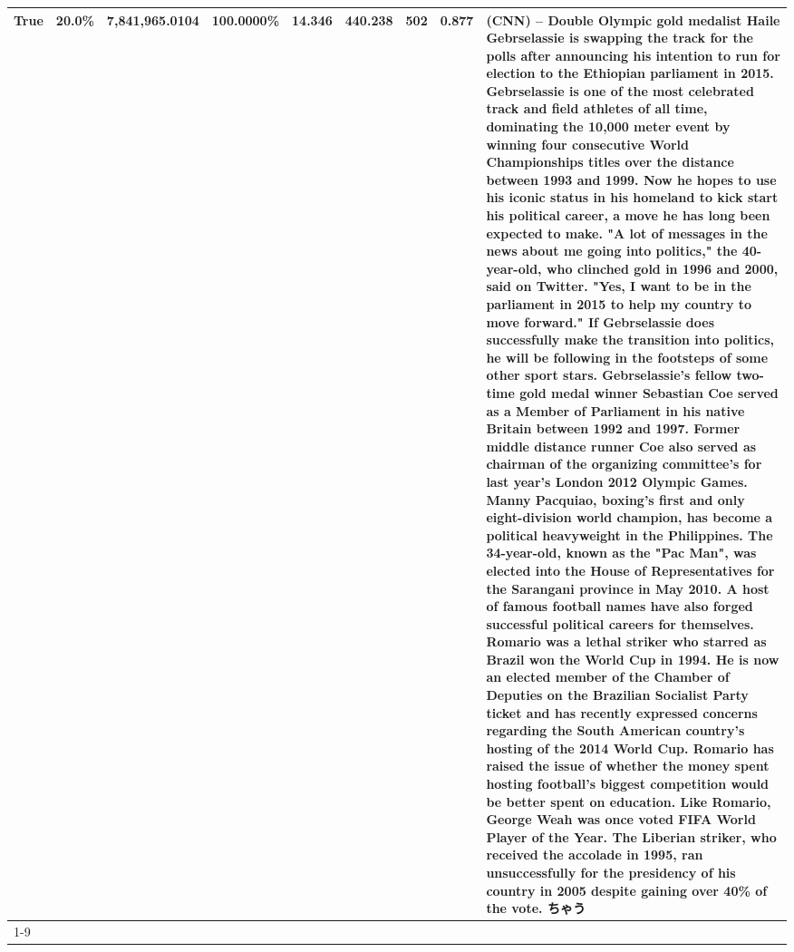 \begin{table}[H]
{\begin{tabular}{lllrlllll}
True & 20.0\% & 7,841,965.0104 & \bfseries \color{red} 100.0000\% & 14.346 & 440.238 & 502 & 0.877 & (CNN) -- Double Olympic gold medalist Haile Gebrselassie is swapping the track for the polls after announcing his intention to run for election to the Ethiopian parliament in 2015. Gebrselassie is one of the most celebrated track and field athletes of all time, dominating the 10,000 meter event by winning four consecutive World Championships titles over the distance between 1993 and 1999. Now he hopes to use his iconic status in his homeland to kick start his political career, a move he has long been expected to make. "A lot of messages in the news about me going into politics," the 40-year-old, who clinched gold in 1996 and 2000, said on Twitter. "Yes, I want to be in the parliament in 2015 to help my country to move forward." If Gebrselassie does successfully make the transition into politics, he will be following in the footsteps of some other sport stars. Gebrselassie's fellow two-time gold medal winner Sebastian Coe served as a Member of Parliament in his native Britain between 1992 and 1997. Former middle distance runner Coe also served as chairman of the organizing committee's for last year's London 2012 Olympic Games. Manny Pacquiao, boxing's first and only eight-division world champion, has become a political heavyweight in the Philippines. The 34-year-old, known as the "Pac Man", was elected into the House of Representatives for the Sarangani province in May 2010. A host of famous football names have also forged successful political careers for themselves. Romario was a lethal striker who starred as Brazil won the World Cup in 1994. He is now an elected member of the Chamber of Deputies on the Brazilian Socialist Party ticket and has recently expressed concerns regarding the South American country's hosting of the 2014 World Cup. Romario has raised the issue of whether the money spent hosting football's biggest competition would be better spent on education. Like Romario, George Weah was once voted FIFA World Player of the Year. The Liberian striker, who received the accolade in 1995, ran unsuccessfully for the presidency of his country in 2005 despite gaining over 40\% of the vote. ちゃう \\
\cline{1-9}

\end{tabular}}
\end{table}
